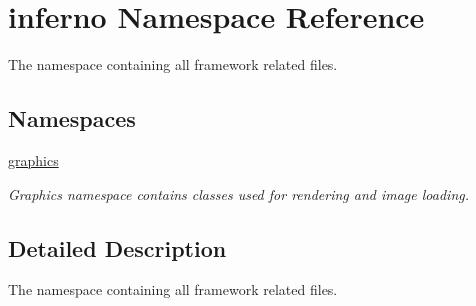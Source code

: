 \hypertarget{namespaceinferno}{}\section{inferno Namespace Reference}
\label{namespaceinferno}


The namespace containing all framework related files.  


\subsection*{Namespaces}
\begin{DoxyCompactItemize}
\item 
 \mbox{\hyperlink{namespaceinferno_1_1graphics}{graphics}}
\begin{DoxyCompactList}\small\item\em Graphics namespace contains classes used for rendering and image loading. \end{DoxyCompactList}\end{DoxyCompactItemize}


\subsection{Detailed Description}
The namespace containing all framework related files. 